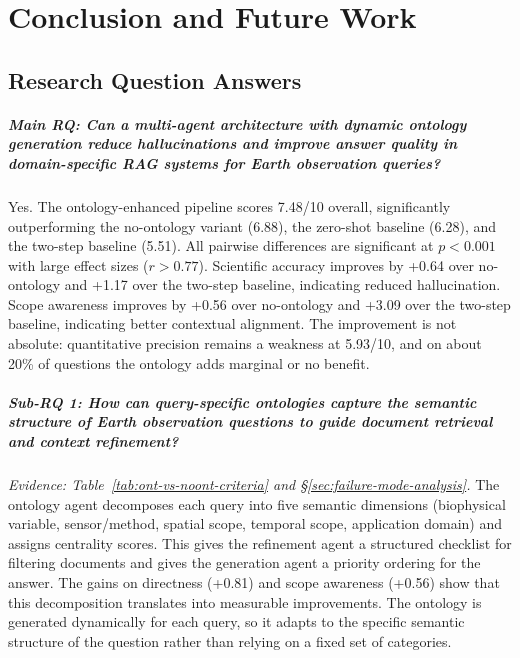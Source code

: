 \chapter{Conclusion and Future Work}
\label{chap:conclusion}

\section{Research Question Answers}
\label{sec:rq-answers}

\paragraph{Main RQ: Can a multi-agent architecture with dynamic ontology generation reduce hallucinations and improve answer quality in domain-specific RAG systems for Earth observation queries?}

Yes. The ontology-enhanced pipeline scores 7.48/10 overall, significantly outperforming the no-ontology variant (6.88), the zero-shot baseline (6.28), and the two-step baseline (5.51). All pairwise differences are significant at $p < 0.001$ with large effect sizes ($r > 0.77$). Scientific accuracy improves by +0.64 over no-ontology and +1.17 over the two-step baseline, indicating reduced hallucination. Scope awareness improves by +0.56 over no-ontology and +3.09 over the two-step baseline, indicating better contextual alignment. The improvement is not absolute: quantitative precision remains a weakness at 5.93/10, and on about 20\% of questions the ontology adds marginal or no benefit.

\paragraph{Sub-RQ 1: How can query-specific ontologies capture the semantic structure of Earth observation questions to guide document retrieval and context refinement?}

\noindent\emph{Evidence: Table~\ref{tab:ont-vs-noont-criteria} and \S\ref{sec:failure-mode-analysis}.}
The ontology agent decomposes each query into five semantic dimensions (biophysical variable, sensor/method, spatial scope, temporal scope, application domain) and assigns centrality scores. This gives the refinement agent a structured checklist for filtering documents and gives the generation agent a priority ordering for the answer. The gains on directness (+0.81) and scope awareness (+0.56) show that this decomposition translates into measurable improvements. The ontology is generated dynamically for each query, so it adapts to the specific semantic structure of the question rather than relying on a fixed set of categories.

